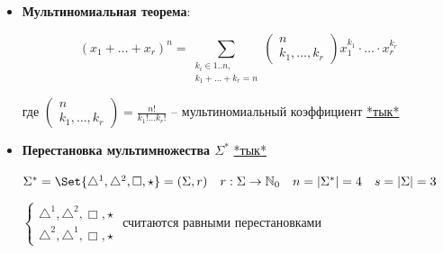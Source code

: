 \documentclass[12pt]{article}
\begin{document}
\begin{itemize}
        \[(x + y)^n = \sum_{k=0}^n \begin{pmatrix}n \\ k\end{pmatrix} x^k y^{n - k}\]

        где $\begin{pmatrix}n \\ k\end{pmatrix}$ -- биномиальный коэффициент
        \hfill\href{https://ru.wikipedia.org/wiki/%D0%91%D0%B8%D0%BD%D0%BE%D0%BC%D0%B8%D0%B0%D0%BB%D1%8C%D0%BD%D1%8B%D0%B9_%D0%BA%D0%BE%D1%8D%D1%84%D1%84%D0%B8%D1%86%D0%B8%D0%B5%D0%BD%D1%82}{*тык*}

        \item \Ths \textbf{Мультиномиальная теорема}:

        \[(x_1 + \dots + x_r)^n = \sum_{\substack{k_i \in 1..n, \\ k_1 + \dots + k_r = n}} \begin{pmatrix}n \\ k_1, \dots, k_r\end{pmatrix} x^{k_1}_1 \cdot \dots \cdot x^{k_r}_r\]

        где $\begin{pmatrix}n \\ k_1, \dots, k_r\end{pmatrix} = \frac{n!}{k_1! \dots k_r!}$ -- мультиномиальный коэффициент
        \hfill\href{https://ru.wikipedia.org/wiki/%D0%9C%D1%83%D0%BB%D1%8C%D1%82%D0%B8%D0%BD%D0%BE%D0%BC%D0%B8%D0%B0%D0%BB%D1%8C%D0%BD%D1%8B%D0%B9_%D0%BA%D0%BE%D1%8D%D1%84%D1%84%D0%B8%D1%86%D0%B8%D0%B5%D0%BD%D1%82}{*тык*}


        \item \textbf{Перестановка мультимножества $\Sigma^*$}
        \hfill\href{https://ru.wikipedia.org/wiki/%D0%9F%D0%B5%D1%80%D0%B5%D1%81%D1%82%D0%B0%D0%BD%D0%BE%D0%B2%D0%BA%D0%B0#%D0%9F%D0%B5%D1%80%D0%B5%D1%81%D1%82%D0%B0%D0%BD%D0%BE%D0%B2%D0%BA%D0%B8_%D1%81_%D0%BF%D0%BE%D0%B2%D1%82%D0%BE%D1%80%D0%B5%D0%BD%D0%B8%D0%B5%D0%BC}{*тык*}

        $\Sigma^* = \Set{\triangle^1, \triangle^2, \Box, \star} = (\Sigma, r) \quad r : \Sigma \to \Natural_0 \quad n = |\Sigma^*| = 4 \quad s = |\Sigma| = 3$

        \Notas $\begin{cases}
                  \triangle^1, \triangle^2, \Box, \star \\
                  \triangle^2, \triangle^1, \Box, \star
        \end{cases}$ считаются равными перестановками


\end{itemize}
\end{document}
